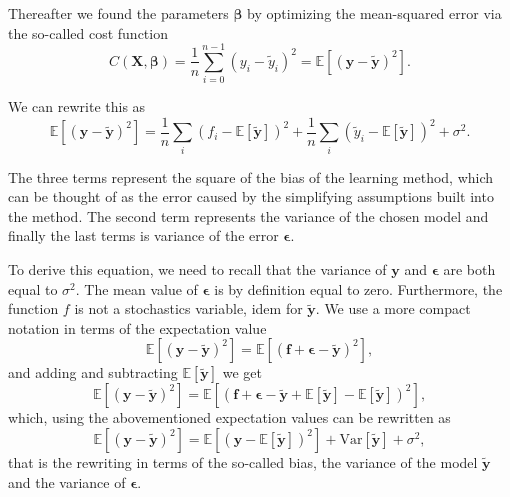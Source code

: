 \documentclass[%
oneside,                 %
final,                   %
10pt]{article}
\begin{document}
Thereafter we found the parameters $\bm{\beta}$ by optimizing the mean-squared error via the so-called cost function
\[
C(\bm{X},\bm{\beta}) =\frac{1}{n}\sum_{i=0}^{n-1}(y_i-\tilde{y}_i)^2=\mathbb{E}\left[(\bm{y}-\bm{\tilde{y}})^2\right].
\]

We can rewrite this as 
\[
\mathbb{E}\left[(\bm{y}-\bm{\tilde{y}})^2\right]=\frac{1}{n}\sum_i(f_i-\mathbb{E}\left[\bm{\tilde{y}}\right])^2+\frac{1}{n}\sum_i(\tilde{y}_i-\mathbb{E}\left[\bm{\tilde{y}}\right])^2+\sigma^2.
\]

The three terms represent the square of the bias of the learning
method, which can be thought of as the error caused by the simplifying
assumptions built into the method. The second term represents the
variance of the chosen model and finally the last terms is variance of
the error $\bm{\epsilon}$.

To derive this equation, we need to recall that the variance of $\bm{y}$ and $\bm{\epsilon}$ are both equal to $\sigma^2$. The mean value of $\bm{\epsilon}$ is by definition equal to zero. Furthermore, the function $f$ is not a stochastics variable, idem for $\bm{\tilde{y}}$.
We use a more compact notation in terms of the expectation value 
\[
\mathbb{E}\left[(\bm{y}-\bm{\tilde{y}})^2\right]=\mathbb{E}\left[(\bm{f}+\bm{\epsilon}-\bm{\tilde{y}})^2\right],
\]
and adding and subtracting $\mathbb{E}\left[\bm{\tilde{y}}\right]$ we get
\[
\mathbb{E}\left[(\bm{y}-\bm{\tilde{y}})^2\right]=\mathbb{E}\left[(\bm{f}+\bm{\epsilon}-\bm{\tilde{y}}+\mathbb{E}\left[\bm{\tilde{y}}\right]-\mathbb{E}\left[\bm{\tilde{y}}\right])^2\right],
\]
which, using the abovementioned expectation values can be rewritten as 
\[
\mathbb{E}\left[(\bm{y}-\bm{\tilde{y}})^2\right]=\mathbb{E}\left[(\bm{y}-\mathbb{E}\left[\bm{\tilde{y}}\right])^2\right]+\mathrm{Var}\left[\bm{\tilde{y}}\right]+\sigma^2,
\]
that is the rewriting in terms of the so-called bias, the variance of the model $\bm{\tilde{y}}$ and the variance of $\bm{\epsilon}$.



\end{document}
